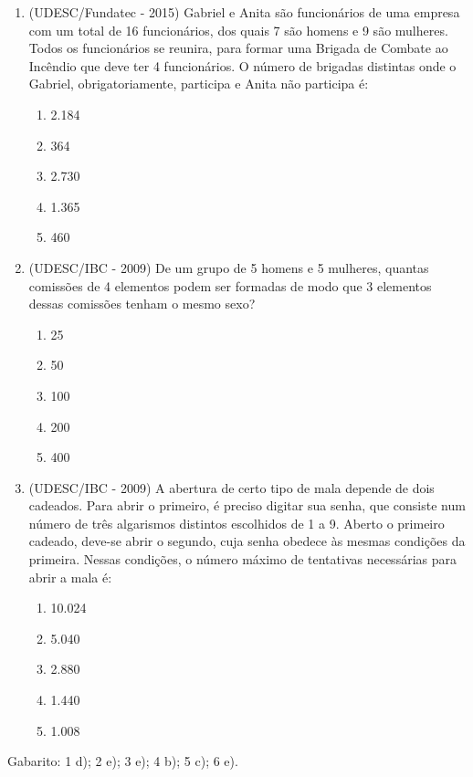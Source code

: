 \begin{enumerate}
 \item (UDESC/Fundatec - 2015) Gabriel e Anita são funcionários de uma empresa com um total de 16 funcionários, dos quais 7 são homens e 9 são mulheres. Todos os funcionários se reunira, para formar uma Brigada de Combate ao Incêndio que deve ter 4 funcionários. O número de brigadas distintas onde o Gabriel, obrigatoriamente, participa e Anita não participa é:
 \begin{enumerate}
 \item 2.184
 \item 364
 \item 2.730
 \item 1.365
 \item 460
 \end{enumerate}

 \item (UDESC/IBC - 2009) De um grupo de 5 homens e 5 mulheres, quantas comissões de 4 elementos podem ser formadas de modo que 3 elementos dessas comissões tenham o mesmo sexo?
 \begin{enumerate}
 \item 25
 \item 50
 \item 100
 \item 200
 \item 400
 \end{enumerate}

 \item (UDESC/IBC - 2009) A abertura de certo tipo de mala depende de dois cadeados. Para abrir o primeiro, é preciso digitar sua senha, que consiste num número de três algarismos distintos escolhidos de 1 a 9. Aberto o primeiro cadeado, deve-se abrir o segundo, cuja senha obedece às mesmas condições da primeira. Nessas condições, o número máximo de tentativas necessárias para abrir a mala é:
 \begin{enumerate}
 \item 10.024
 \item 5.040
 \item 2.880
 \item 1.440
 \item 1.008
 \end{enumerate}


\end{enumerate}
Gabarito: 1 d); 2 e); 3 e); 4 b); 5 c); 6 e).

